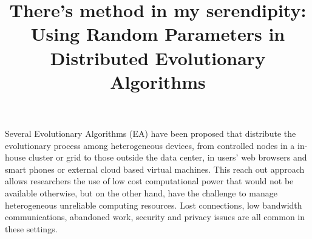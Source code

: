 \documentclass{llncs}
\begin{document}
\title{There's method in my serendipity:  Using Random Parameters in
  Distributed Evolutionary Algorithms}

\maketitle              %






Several Evolutionary Algorithms (EA) have been proposed that distribute the evolutionary process among heterogeneous devices, from controlled nodes in a in-house cluster or grid to those outside the data center, in users’ web browsers and smart phones or external cloud based virtual machines. This reach out approach allows researchers the use of low cost computational power that would not be available otherwise, but on the other hand, have the challenge to manage heterogeneous unreliable computing resources. Lost connections, low bandwidth communications, abandoned work, security and privacy issues are all common in these settings.
\end{document}

